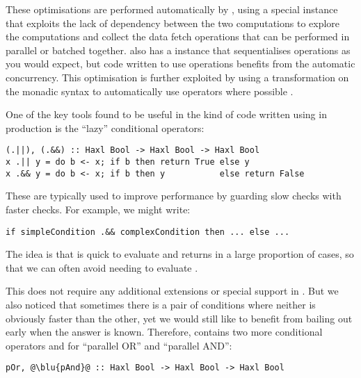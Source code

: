 These optimisations are performed automatically by \Haxl, using a
special  instance that exploits the lack of
dependency between the two computations to explore the computations
and collect the data fetch operations that can be performed in
parallel or batched together. \Haxl also has a  instance
that sequentialises operations as you would expect, but code written
to use  operations benefits from the automatic
concurrency. This optimisation is further exploited by using a
transformation on the monadic  syntax to automatically use
 operators where possible \cite{marlow2016applicativedo}.

One of the key tools found to be useful in the kind of code written
using \Haxl in production is the ``lazy'' conditional operators:


\vspace{1mm}
\begin{verbatim}
(.||), (.&&) :: Haxl Bool -> Haxl Bool -> Haxl Bool
x .|| y = do b <- x; if b then return True else y
x .&& y = do b <- x; if b then y           else return False
\end{verbatim}
\vspace{1mm}

These are typically used to improve performance by guarding slow
checks with faster checks.  For example, we might write:

\begin{verbatim}
if simpleCondition .&& complexCondition then ... else ...
\end{verbatim}

\noindent
The idea is that  is quick to evaluate and
returns  in a large proportion of cases, so that we can
often avoid needing to evaluate .

This does not require any additional extensions or special support in
\Haxl. But we also noticed that sometimes there is a pair of conditions
where neither is obviously faster than the other, yet we would still
like to benefit from bailing out early when the answer is known.
Therefore, \Haxl contains two more conditional operators  and
 for ``parallel OR'' and ``parallel AND'':

\begin{verbatim}
pOr, @\blu{pAnd}@ :: Haxl Bool -> Haxl Bool -> Haxl Bool
\end{verbatim}

